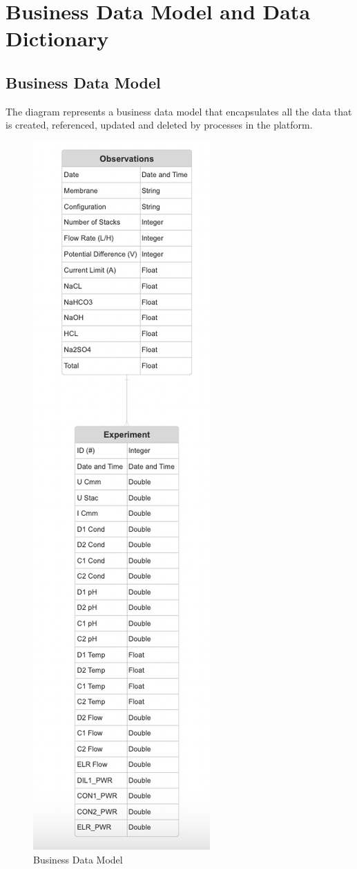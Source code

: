 \documentclass[12pt]{article}
\begin{document}
\section{Business Data Model and Data Dictionary}
\subsection{Business Data Model}
The diagram represents a business data model that encapsulates all the data that is
created, referenced, updated and deleted by processes in the platform.

\begin{figure}[H]
  \centering
  \includegraphics[scale=0.98]{Diagrams/Business Data Model.png}
  \caption{Business Data Model}
\end{figure}
\end{document}
